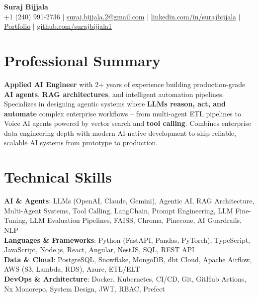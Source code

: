 \documentclass[letterpaper,11pt]{article}
\begin{document}
\begin{center}
    \textbf{\huge Suraj Bijjala} \\ \vspace{2pt}
    \small
    +1 (240) 991-2736 $|$
    \href{mailto:suraj.bijjala.2@gmail.com}{{suraj.bijjala.2@gmail.com}} $|$
    \href{https://www.linkedin.com/in/surajbijjala}{{linkedin.com/in/surajbijjala}} $|$
    \href{https://www.datascienceportfol.io/surajbijjala}{Portfolio} $|$
    \href{https://github.com/surajbijjala1}{{github.com/surajbijjala1}}
\end{center}

\vspace{-18pt}

\section{Professional Summary}
\small{
\textbf{Applied AI Engineer} with 2+ years of experience building production-grade \textbf{AI agents}, \textbf{RAG architectures}, and intelligent automation pipelines. Specializes in designing agentic systems where \textbf{LLMs reason, act, and automate} complex enterprise workflows -- from multi-agent ETL pipelines to Voice AI agents powered by vector search and \textbf{tool calling}. Combines enterprise data engineering depth with modern AI-native development to ship reliable, scalable AI systems from prototype to production.
}
\vspace{-8pt}

\section{Technical Skills}
\small{
\linespread{1.15}\selectfont
\textbf{AI \& Agents}{: LLMs (OpenAI, Claude, Gemini), Agentic AI, RAG Architecture, Multi-Agent Systems, Tool Calling, LangChain, Prompt Engineering, LLM Fine-Tuning, LLM Evaluation Pipelines, FAISS, Chroma, Pinecone, AI Guardrails, NLP} \\
\textbf{Languages \& Frameworks}{: Python (FastAPI, Pandas, PyTorch), TypeScript, JavaScript, Node.js, React, Angular, NestJS, SQL, REST API} \\
\textbf{Data \& Cloud}{: PostgreSQL, Snowflake, MongoDB, dbt Cloud, Apache Airflow, AWS (S3, Lambda, RDS), Azure, ETL/ELT} \\
\textbf{DevOps \& Architecture}{: Docker, Kubernetes, CI/CD, Git, GitHub Actions, Nx Monorepo, System Design, JWT, RBAC, Prefect}
}
\vspace{-8pt}
\end{document}

